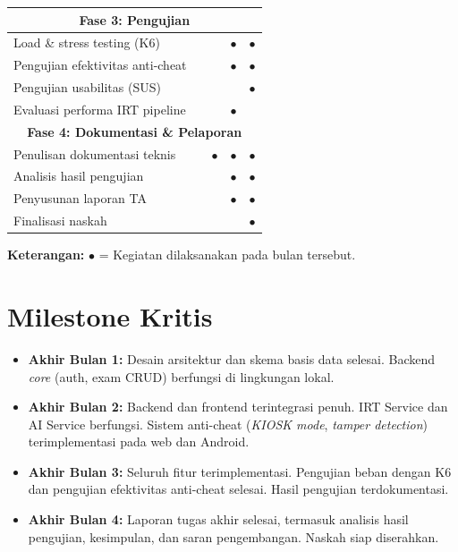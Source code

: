 \begin{table}[H]
\begin{tabular}{|l|c|c|c|c|}
		\hline
		\hline
		\multicolumn{5}{|c|}{\textbf{Fase 3: Pengujian}}                                                                    \\
		\hline
		Load \& stress testing (K6)            &                                     &            & $\bullet$  & $\bullet$  \\
		\hline
		Pengujian efektivitas anti-cheat       &                                     &            & $\bullet$  & $\bullet$  \\
		\hline
		Pengujian usabilitas (SUS)             &                                     &            &            & $\bullet$  \\
		\hline
		Evaluasi performa IRT pipeline         &                                     &            & $\bullet$  &            \\
		\hline
		\hline
		\multicolumn{5}{|c|}{\textbf{Fase 4: Dokumentasi \& Pelaporan}}                                                     \\
		\hline
		Penulisan dokumentasi teknis           &                                     & $\bullet$  & $\bullet$  & $\bullet$  \\
		\hline
		Analisis hasil pengujian               &                                     &            & $\bullet$  & $\bullet$  \\
		\hline
		Penyusunan laporan TA                  &                                     &            & $\bullet$  & $\bullet$  \\
		\hline
		Finalisasi naskah                      &                                     &            &            & $\bullet$  \\
		\hline
	\end{tabular}
\end{table}

\noindent \textbf{Keterangan:} $\bullet$ = Kegiatan dilaksanakan pada bulan tersebut.

\section{Milestone Kritis}

\begin{itemize}
	\item \textbf{Akhir Bulan 1:} Desain arsitektur dan skema basis data selesai. Backend \textit{core} (auth, exam CRUD) berfungsi di lingkungan lokal.

	\item \textbf{Akhir Bulan 2:} Backend dan frontend terintegrasi penuh. IRT Service dan AI Service berfungsi. Sistem anti-cheat (\textit{KIOSK mode}, \textit{tamper detection}) terimplementasi pada web dan Android.

	\item \textbf{Akhir Bulan 3:} Seluruh fitur terimplementasi. Pengujian beban dengan K6 dan pengujian efektivitas anti-cheat selesai. Hasil pengujian terdokumentasi.

	\item \textbf{Akhir Bulan 4:} Laporan tugas akhir selesai, termasuk analisis hasil pengujian, kesimpulan, dan saran pengembangan. Naskah siap diserahkan.
\end{itemize}
